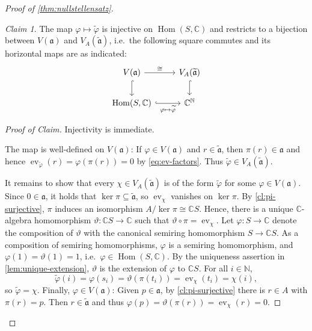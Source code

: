 \documentclass[11pt]{scrartcl}
\theoremstyle{definition}
\theoremstyle{plain}
\theoremstyle{remark}
\newtheorem{claim}[definition]{Claim}
\newenvironment{claimproof}[1][Proof of Claim]{\begin{proof}[#1] \renewcommand{\qedsymbol}{$\lrcorner$}}{ \end{proof}}
\renewcommand\phi\varphi
\DeclareMathOperator\Hom{Hom}
\DeclareMathOperator{\ev}{ev}
\renewcommand\theta\vartheta
\begin{document}
\begin{proof}[Proof of \cref{thm:nullstellensatz}]
		\begin{claim}\label{cl:zero-sets}
			The map $\phi \mapsto \widetilde\phi$ is injective on $\Hom(S, \mathbb{C})$
			and restricts to a bijection between $V(\mathfrak{a})$ and $V_A(\widetilde{\mathfrak{a}})$,
			i.e.\ the following square commutes and its horizontal maps are as indicated:
			\[
			\begin{tikzcd}
				V(\mathfrak{a}) \arrow[d, hook] \arrow[r, "\cong"] & V_A(\widetilde{\mathfrak{a}}) \arrow[d, hook] \\
				{\Hom(S, \mathbb{C})} \arrow[r, hook, "\phi \mapsto \widetilde\phi"']   & \mathbb{C}^{\mathbb{N}}
			\end{tikzcd}
			\]
		\end{claim}
		\begin{claimproof}
			Injectivity is immediate.

			The map is well-defined on $V(\mathfrak{a})$:
			If $\phi \in V(\mathfrak{a})$ and $r \in \widetilde{\mathfrak{a}}$,
			then $\pi(r) \in \mathfrak{a}$ and hence
			$\ev_{\widetilde\phi}(r) = \phi(\pi(r)) = 0$ by \eqref{eq:ev-factors}.
			Thus $\widetilde\phi \in V_A(\widetilde{\mathfrak{a}})$.

			It remains to show that every $\chi \in V_A(\widetilde{\mathfrak{a}})$
			is of the form $\widetilde\phi$ for some $\phi \in V(\mathfrak{a})$.
			Since $0 \in \mathfrak{a}$, it holds that $\ker \pi \subseteq \widetilde{\mathfrak{a}}$,
			so $\ev_{\chi}$ vanishes on $\ker\pi$.
			By \cref{cl:pi-surjective},
			$\pi$ induces an isomorphism $A / \ker \pi \cong \mathbb{C}S$.
			Hence, there is a unique $\mathbb{C}$-algebra homomorphism
			$\theta \colon \mathbb{C}S \to \mathbb{C}$ such that $\theta \circ \pi = \ev_{\chi}$.
			Let $\phi \colon S \to \mathbb{C}$ denote the composition of $\theta$
			with the canonical semiring homomorphism $S \to \mathbb{C}S$.
			As a composition of semiring homomorphisms,
			$\phi$ is a semiring homomorphism,
			and $\phi(1) = \theta(1) = 1$,
			i.e.\ $\phi \in \Hom(S, \mathbb{C})$.
			By the uniqueness assertion in \cref{lem:unique-extension},
			$\theta$ is the extension of $\phi$ to $\mathbb{C}S$.
			For all $i \in \mathbb{N}$,
			\[
				\widetilde\phi(i) = \phi(s_i) = \theta(\pi(t_i)) = \ev_{\chi}(t_i) = \chi(i),
			\]
			so $\widetilde\phi = \chi$.
			Finally, $\phi \in V(\mathfrak{a})$:
			Given $p \in \mathfrak{a}$,
			by \cref{cl:pi-surjective} there is $r \in A$ with $\pi(r) = p$.
			Then $r \in \widetilde{\mathfrak{a}}$ and thus
			$\phi(p) = \theta(\pi(r)) = \ev_{\chi}(r) = 0$.
		\end{claimproof}


\end{proof}
\end{document}
